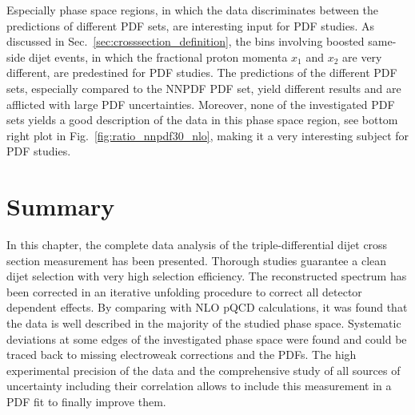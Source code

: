 Especially phase space regions, in which the data discriminates between the
predictions of different PDF sets, are interesting input for PDF studies. As
discussed in Sec.~\ref{sec:crosssection_definition}, the bins involving boosted
same-side dijet events, in which the fractional proton momenta $x_1$ and $x_2$
are very different, are predestined for PDF studies. The predictions of the
different PDF sets, especially compared to the NNPDF PDF set, yield different
results and are afflicted with large PDF uncertainties. Moreover, none of the
investigated PDF sets yields a good description of the data in this phase space
region, see bottom right plot in Fig.~\ref{fig:ratio_nnpdf30_nlo}, making it a very
interesting subject for PDF studies.

\section{Summary}

In this chapter, the complete data analysis of the triple-differential dijet
cross section measurement has been presented. Thorough studies guarantee a clean
dijet selection with very high selection efficiency. The reconstructed spectrum
has been corrected in an iterative unfolding procedure to correct all detector
dependent effects. By comparing with NLO pQCD calculations, it was found that
the data is well described in the majority of the studied phase space.
Systematic deviations at some edges of the investigated phase space were found
and could be traced back to missing electroweak corrections and the PDFs. The
high experimental precision of the data and the comprehensive study of all sources of
uncertainty including their correlation allows to include this measurement in a
PDF fit to finally improve them.



